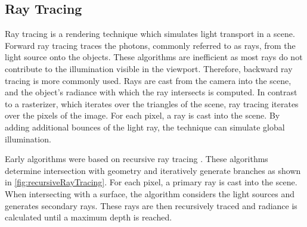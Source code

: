 \subsection{Ray Tracing}
\label{ch:rayTracingTheory}

Ray tracing is a rendering technique which simulates light transport in a scene. Forward ray tracing traces the photons, commonly referred to as rays, from the light source onto the objects. These algorithms are inefficient as most rays do not contribute to the illumination visible in the viewport. Therefore, backward ray tracing is more commonly used. Rays are cast from the camera into the scene, and the object's radiance with which the ray intersects is computed. In contrast to a rasterizer, which iterates over the triangles of the scene, ray tracing iterates over the pixels of the image. For each pixel, a ray is cast into the scene. By adding additional bounces of the light ray, the technique can simulate global illumination.

Early algorithms were based on recursive ray tracing \cite{whittedGlobalIllumination}. These algorithms determine intersection with geometry and iteratively generate branches as shown in \autoref{fig:recursiveRayTracing}. For each pixel, a primary ray is cast into the scene. When intersecting with a surface, the algorithm considers the light sources and generates secondary rays. These rays are then recursively traced and radiance is calculated until a maximum depth is reached.

